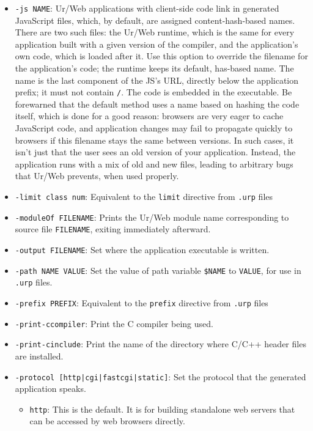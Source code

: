 \documentclass{article}
\begin{document}
\begin{itemize}
\item \texttt{-js NAME}: Ur/Web applications with client-side code link in generated JavaScript files, which, by default, are assigned content-hash-based names.  There are two such files: the Ur/Web runtime, which is the same for every application built with a given version of the compiler, and the application's own code, which is loaded after it.  Use this option to override the filename for the application's code; the runtime keeps its default, has-based name.  The name is the last component of the JS's URL, directly below the application prefix; it must not contain \texttt{/}.  The code is embedded in the executable.  Be forewarned that the default method uses a name based on hashing the code itself, which is done for a good reason: browsers are very eager to cache JavaScript code, and application changes may fail to propagate quickly to browsers if this filename stays the same between versions.  In such cases, it isn't just that the user sees an old version of your application.  Instead, the application runs with a mix of old and new files, leading to arbitrary bugs that Ur/Web prevents, when used properly.

\item \texttt{-limit class num}: Equivalent to the \texttt{limit} directive from \texttt{.urp} files

\item \texttt{-moduleOf FILENAME}: Prints the Ur/Web module name corresponding to source file \texttt{FILENAME}, exiting immediately afterward.

\item \texttt{-output FILENAME}: Set where the application executable is written.

\item \texttt{-path NAME VALUE}: Set the value of path variable \texttt{\$NAME} to \texttt{VALUE}, for use in \texttt{.urp} files.

\item \texttt{-prefix PREFIX}: Equivalent to the \texttt{prefix} directive from \texttt{.urp} files

\item \texttt{-print-ccompiler}: Print the C compiler being used.

\item \texttt{-print-cinclude}: Print the name of the directory where C/C++ header files are installed.

\item \texttt{-protocol [http|cgi|fastcgi|static]}: Set the protocol that the generated application speaks.
  \begin{itemize}
  \item \texttt{http}: This is the default.  It is for building standalone web servers that can be accessed by web browsers directly.


\end{itemize}
\end{itemize}
\end{document}

